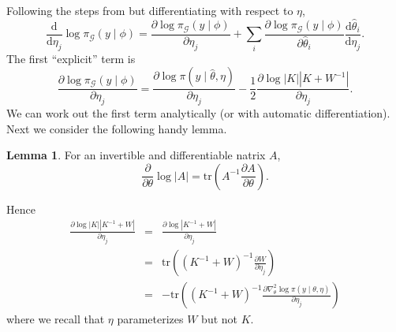 \documentclass[stslayout, noinfoline]{imsart}
\theoremstyle{definition}
\newtheorem{lemma}{Lemma}
\begin{document}
Following the steps from \citet{Rasmussen:2006} but differentiating with respect to $\eta$,
\begin{equation}
  \frac{\mathrm d }{\mathrm d \eta_j} \log \pi_\mathcal{G}(y \mid \phi) = \frac{\partial \log \pi_\mathcal{G}(y \mid \phi)}{\partial \eta_j} + \sum_i \frac{\partial \log \pi_\mathcal{G}(y \mid \phi)}{\partial \hat \theta_i} \frac{\mathrm d \hat \theta_i}{\mathrm d \eta_j}.
\end{equation}
%
The first ``explicit'' term is
%
\begin{equation}
  \frac{\partial \log \pi_\mathcal{G}(y \mid \phi)}{\partial \eta_j}
    = \frac{\partial \log \pi(y \mid \hat \theta, \eta)}{\partial \eta_j} - \frac{1}{2} \frac{\partial \log |K||K + W^{-1}|}{\partial \eta_j}.
\end{equation}
%
We can work out the first term analytically (or with automatic differentiation).
Next we consider the following handy lemma.
\begin{lemma} \cite[equation A.15]{Rasmussen:2006}
  For an invertible and differentiable natrix $A$, 
\begin{equation*}
  \frac{\partial}{\partial \theta} \log |A| = \mathrm{tr} \left (A^{-1} \frac{\partial A}{\partial \theta} \right).
\end{equation*}
\end{lemma}

Hence
\begin{eqnarray*}
  \frac{\partial \log |K||K^{-1} + W|}{\partial \eta_j} & = & \frac{\partial \log |K^{-1} + W|}{\partial \eta_j} \\
    & = & \mathrm{tr} \left ((K^{-1} + W)^{-1} \frac{\partial W}{\partial \eta_j} \right) \\
    & = & - \mathrm{tr} \left ((K^{-1} + W)^{-1} \frac{\partial \nabla_\theta^2 \log \pi(y \mid \theta, \eta)}{\partial \eta_j} \right)
\end{eqnarray*} 
where we recall that $\eta$ parameterizes $W$ but not $K$.
\end{document}
